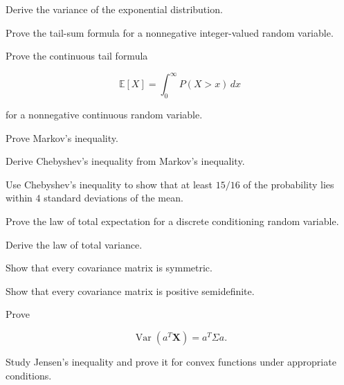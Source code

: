 \begin{exercise}[3]
Derive the variance of the exponential distribution.
\end{exercise}

\begin{exercise}[3]
Prove the tail-sum formula for a nonnegative integer-valued random
variable.
\end{exercise}

\begin{exercise}[3]
Prove the continuous tail formula

\[
\mathbb{E}[X]
=
\int_0^\infty P(X>x)\,dx
\]

for a nonnegative continuous random variable.
\end{exercise}

\begin{exercise}[3]
Prove Markov's inequality.
\end{exercise}

\begin{exercise}[3]
Derive Chebyshev's inequality from Markov's inequality.
\end{exercise}

\begin{exercise}[3]
Use Chebyshev's inequality to show that at least \(15/16\) of the
probability lies within \(4\) standard deviations of the mean.
\end{exercise}

\begin{exercise}[3]
Prove the law of total expectation for a discrete conditioning random
variable.
\end{exercise}

\begin{exercise}[3]
Derive the law of total variance.
\end{exercise}

\begin{exercise}[3]
Show that every covariance matrix is symmetric.
\end{exercise}

\begin{exercise}[3]
Show that every covariance matrix is positive semidefinite.
\end{exercise}

\begin{exercise}[3]
Prove

\[
\operatorname{Var}(a^T\mathbf{X})
=
a^T\Sigma a.
\]
\end{exercise}

\begin{exercise}[4]
Study Jensen's inequality and prove it for convex functions under
appropriate conditions.
\end{exercise}

